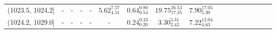 \begin{tabular}{@{\extracolsep\fill}rcccccccccccccccc}
(1023.5, 1024.2] &                            - &                           - &                           - &                           - &           $5.62_{4.51}^{7.57}$ &             $0.64_{0.54}^{0.80}$ &        $19.75_{17.35}^{26.53}$ &         $7.90_{5.30}^{17.05}$ \\
(1024.2, 1029.0] &                            - &                           - &                           - &                           - &          - &             $0.24_{0.20}^{0.33}$ &           $3.30_{2.42}^{5.31}$ &         $7.22_{4.63}^{12.04}$ \\
\bottomrule
\end{tabular}
